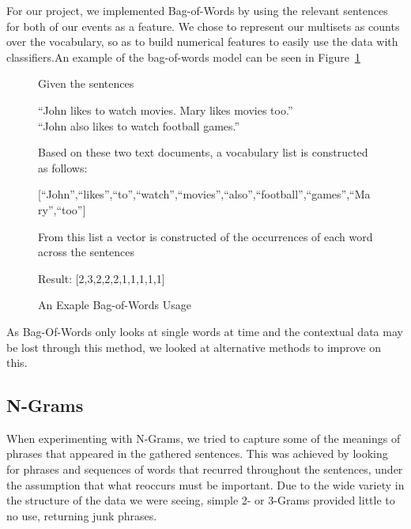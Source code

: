 \documentclass[bsc,frontabs,twoside,singlespacing,parskip,deptreport]{infthesis}     %
\begin{document}
For our project, we implemented Bag-of-Words by using the relevant sentences for both of our events as a feature.
We chose to represent our multisets as counts over the vocabulary, so as to build numerical features to easily
use the data with classifiers.An example of the bag-of-words model can be seen in Figure~\ref{fig:bow}
\begin{figure}
\begin{tcolorbox}[width=\textwidth,
                  interior hidden,
                  boxsep=10pt,
                  left=0pt,
                  right=0pt,
                  top=2pt,
                  ]%
  Given the sentences \vspace{0.5em}\\
  \begin{center}``John likes to watch movies. Mary likes movies too.''\\
  ``John also likes to watch football games.''\vspace{1em}\\
   \end{center}
    Based on these two text documents, a vocabulary list is constructed as follows:\vspace{1em}\\
    \begin{center}
  [``John'',``likes'',``to'',``watch'',``movies'',``also'',``football'',``games'',``Mary'',``too'']\vspace{1em}\\
\end{center}
    From this list a vector is constructed of the occurrences
    of each word across the sentences\vspace{1em}\\
 \begin{center} 
  Result: [2,3,2,2,2,1,1,1,1,1]
\end{center}
\end{tcolorbox}
\caption{An Exaple Bag-of-Words Usage}
\label{fig:bow}
\end{figure}

As Bag-Of-Words only looks at single words at time and the contextual data may be lost through this method, we looked at
alternative methods to improve on this.

\subsection{N-Grams}
When experimenting with N-Grams, we tried to capture some of the meanings of phrases that appeared in the gathered
sentences.
This was achieved by looking for phrases and sequences of words that recurred throughout the sentences, under the assumption
that what reoccurs must be important. Due to the wide variety in the structure of the data we were seeing,
simple 2- or 3-Grams provided little to no use, returning junk phrases.
\end{document}
